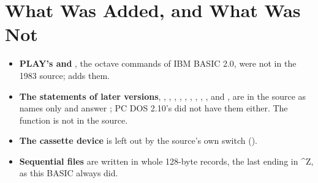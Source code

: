 \section{What Was Added, and What Was Not}

\begin{itemize}
\item \textbf{PLAY's \code{>} and \code{<}}, the octave commands of IBM
  BASIC 2.0, were not in the 1983 source;  adds them.
\item \textbf{The statements of later versions}, ,
  , , , ,
  , , , ,
   and , are in the source as names only and
  answer ; PC DOS 2.10's  did not
  have them either. The function \typed{)} is not in
  the source.
\item \textbf{The cassette device} is left out by the source's own switch
  ().
\item \textbf{Sequential files} are written in whole 128-byte records,
  the last ending in \^{}Z, as this BASIC always did.
\end{itemize}
